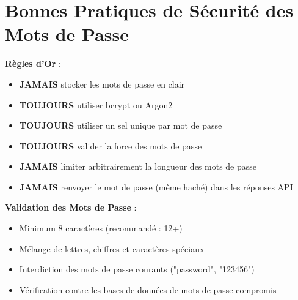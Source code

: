 \section{Bonnes Pratiques de Sécurité des Mots de Passe}

\begin{bestpracticebox}
    \textbf{Règles d'Or} :
    \begin{itemize}
        \item \textbf{JAMAIS} stocker les mots de passe en clair
        \item \textbf{TOUJOURS} utiliser bcrypt ou Argon2
        \item \textbf{TOUJOURS} utiliser un sel unique par mot de passe
        \item \textbf{TOUJOURS} valider la force des mots de passe
        \item \textbf{JAMAIS} limiter arbitrairement la longueur des mots de passe
        \item \textbf{JAMAIS} renvoyer le mot de passe (même haché) dans les réponses API
    \end{itemize}
\end{bestpracticebox}

\begin{securitybox}
    \textbf{Validation des Mots de Passe} :
    \begin{itemize}
        \item Minimum 8 caractères (recommandé : 12+)
        \item Mélange de lettres, chiffres et caractères spéciaux
        \item Interdiction des mots de passe courants ("password", "123456")
        \item Vérification contre les bases de données de mots de passe compromis
    \end{itemize}
\end{securitybox}

